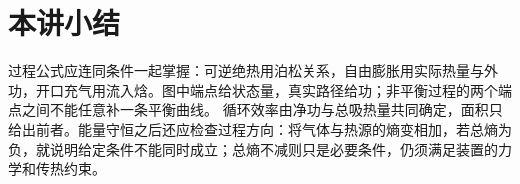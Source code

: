\section{本讲小结}
过程公式应连同条件一起掌握：可逆绝热用泊松关系，自由膨胀用实际热量与外功，开口充气用流入焓。图中端点给状态量，真实路径给功；非平衡过程的两个端点之间不能任意补一条平衡曲线。
循环效率由净功与总吸热量共同确定，面积只给出前者。能量守恒之后还应检查过程方向：将气体与热源的熵变相加，若总熵为负，就说明给定条件不能同时成立；总熵不减则只是必要条件，仍须满足装置的力学和传热约束。
